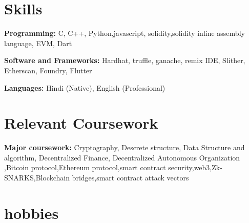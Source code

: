 \documentclass[letterpaper,11pt]{article}
\newcommand{\resumeSubHeadingListStart}{\begin{itemize}[leftmargin=0.15in, label={}]}
\newcommand{\resumeSubHeadingListEnd}{\end{itemize}}
\begin{document}
\section{Skills}
  \vspace{2pt}
  \resumeSubHeadingListStart
    \small{\item{
        \textbf{Programming:}{ C, C++, Python,javascript, solidity,solidity inline assembly language, EVM, Dart } \\ \vspace{3pt}

        \textbf{Software and Frameworks:}{ Hardhat, truffle, ganache, 
remix IDE, Slither, Etherscan, Foundry, Flutter } \\ \vspace{3pt}
        
        
        
        \textbf{Languages:}{ Hindi (Native), English (Professional)}
        
    }}
  \resumeSubHeadingListEnd




\section{Relevant Coursework}
  \vspace{2pt}
  \resumeSubHeadingListStart
    \small{\item{
        \textbf{Major coursework:}{ Cryptography, Descrete structure, Data Structure and algorithm, Decentralized Finance, Decentralized Autonomous Organization ,Bitcoin protocol,Ethereum protocol,smart contract security,web3,Zk-SNARKS,Blockchain bridges,smart contract attack vectors} \\ \vspace{3pt}
        
    }}
  \resumeSubHeadingListEnd




\section{hobbies}
\end{document}
